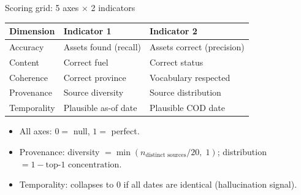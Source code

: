 \documentclass[aspectratio=169]{beamer}
\begin{document}
\begin{frame}{Scoring grid: 5 axes $\times$ 2 indicators}
\small
\begin{tabular}{@{}l l l@{}}
\toprule
\textbf{Dimension} & \textbf{Indicator 1} & \textbf{Indicator 2} \\
\midrule
Accuracy    & Assets found (recall)       & Assets correct (precision) \\
Content     & Correct fuel                & Correct status \\
Coherence   & Correct province            & Vocabulary respected \\
Provenance  & Source diversity            & Source distribution \\
Temporality & Plausible as-of date        & Plausible COD date \\
\bottomrule
\end{tabular}

\bigskip
\begin{itemize}\setlength\itemsep{0.6em}
  \item All axes: $0 =$ null, $1 =$ perfect.
  \item Provenance: diversity $= \min(n_{\text{distinct sources}}/20,\; 1)$;
        distribution $= 1 - \text{top-1 concentration}$.
  \item Temporality: collapses to $0$ if all dates are identical (hallucination signal).
\end{itemize}
\end{frame}
\end{document}
